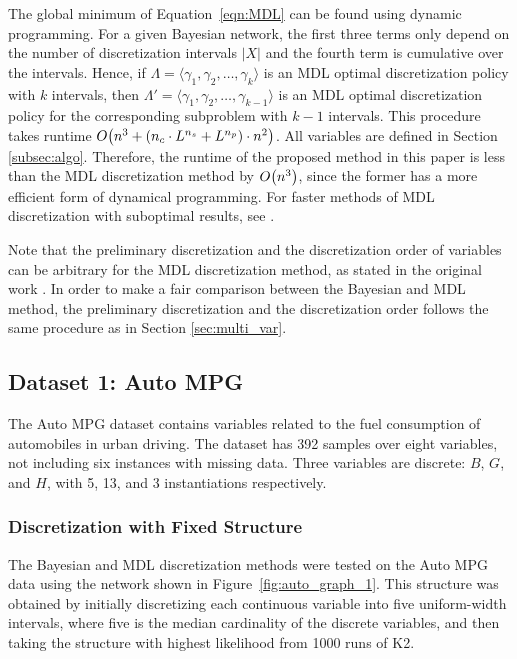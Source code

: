 \documentclass[twoside,11pt]{article}
\newcommand{\citep}[1]{\cite{#1}}
\newcommand{\citet}[1]{\citeauthor{#1} \citeyear{#1}}
\newcommand{\bigo}{O} %
\newcommand{\paren}[1]{\mathopen{}\mathclose\bgroup\left(#1\aftergroup\egroup\right)}
\newcommand{\anglebrackets}[1]{\langle #1 \rangle}
\begin{document}
The global minimum of Equation~\ref{eqn:MDL} can be found using dynamic programming.
For a given Bayesian network, the first three terms only depend on the number of discretization intervals $|X|$ and the fourth term is cumulative over the intervals.
Hence, if ${\Lambda = \anglebrackets{\gamma_1, \gamma_2, \ldots, \gamma_k}}$ is an MDL optimal discretization policy with $k$ intervals, then ${\Lambda' = \anglebrackets{\gamma_1, \gamma_2, \ldots, \gamma_{k-1}}}$ is an MDL optimal discretization policy for the corresponding subproblem with $k-1$ intervals.
This procedure takes runtime $\bigo \paren{ n^3 + \paren{ n_c \cdot {L}^{n_s}  + {L}^{n_p}} \cdot n^2 }$.
All variables are defined in Section \ref{subsec:algo}.
Therefore, the runtime of the proposed method in this paper is less than the MDL discretization method by $\bigo \paren{n^3}$, since the former has a more efficient form of dynamical programming.
For faster methods of MDL discretization with suboptimal results, see \citet{Friedman_1996}.

Note that the preliminary discretization and the discretization order of variables can be arbitrary for the MDL discretization method, as stated in the original work \citep{Friedman_1996}. In order to make a fair comparison between the Bayesian and MDL method, the preliminary discretization and the discretization order follows the same procedure as in Section \ref{sec:multi_var}.

\subsection{Dataset 1: Auto MPG}
\label{subsec:auto}

The Auto MPG dataset contains variables related to the fuel consumption of automobiles in urban driving.
The dataset has \num{392} samples over eight variables, not including six instances with missing data.
Three variables are discrete: $B$, $G$, and $H$, with \num{5}, \num{13}, and \num{3} instantiations respectively.

\subsubsection{Discretization with Fixed Structure}
\label{subsubsec:auto_exp1}

The Bayesian and MDL discretization methods were tested on the Auto MPG data using the network shown in Figure~\ref{fig:auto_graph_1}.
This structure was obtained by initially discretizing each continuous variable into five uniform-width intervals, where five is the median cardinality of the discrete variables, and then taking the structure with highest likelihood from \num{1000} runs of K2.
\end{document}
